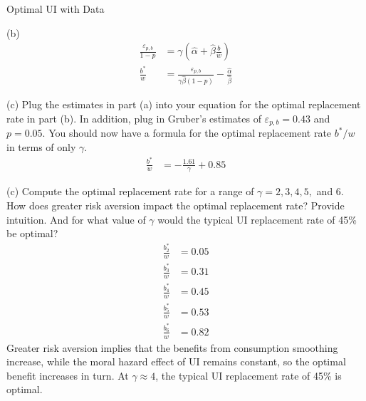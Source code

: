 \documentclass[8pt]{extarticle}
\begin{document}
\begin{problem}{Optimal UI with Data}
\begin{problem}{(b)}
      \tcblower
      \begin{align*}
        \frac{\varepsilon_{p,b}}{1-p} &= \gamma \left(\hat\alpha + \hat\beta\frac{b}{w}\right)\\
        \frac{b^*}{w} &= \frac{\varepsilon_{p,b}}{\gamma\hat\beta(1-p)} - \frac{\hat\alpha}{\hat\beta}
      \end{align*}
    \end{problem}
    \begin{problem}{(c)}
      Plug the estimates in part (a) into your equation for the optimal replacement rate in part (b). In addition, plug in Gruber's estimates of $\varepsilon_{p,b} = 0.43$ and $p = 0.05$. You should now have a formula for the optimal replacement rate $b^*/w$ in terms of only $\gamma$.
      \tcblower
      \begin{align*}
        \frac{b^*}{w} &= -\frac{1.61}{\gamma} + 0.85
      \end{align*}
    \end{problem}
    \begin{problem}{(c)}
      Compute the optimal replacement rate for a range of $\gamma = 2,3,4,5,$ and $6$. How does greater risk aversion impact the optimal replacement rate? Provide intuition. And for what value of $\gamma$ would the typical UI replacement rate of 45\% be optimal?
      \tcblower
      \begin{align*}
        \frac{b^*_2}{w} &= 0.05\\
        \frac{b^*_3}{w} &= 0.31\\
        \frac{b^*_4}{w} &= 0.45\\
        \frac{b^*_5}{w} &= 0.53\\
        \frac{b^*_6}{w} &= 0.82
      \end{align*}
      Greater risk aversion implies that the benefits from consumption smoothing increase, while the moral hazard effect of UI remains constant, so the optimal benefit increases in turn. At $\gamma \approx 4$, the typical UI replacement rate of 45\% is optimal.
    \end{problem}
  \end{problem}
\end{document}
